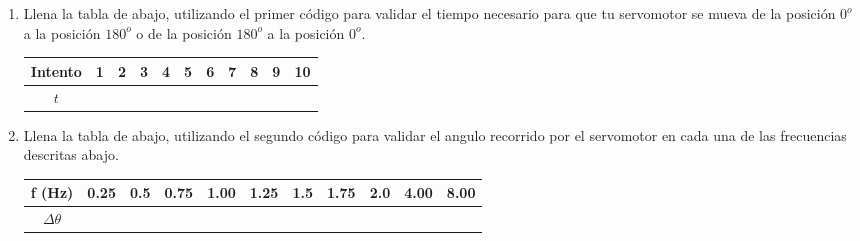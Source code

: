	\begin{enumerate}
		\item Llena la tabla de abajo, utilizando el primer código para validar el tiempo necesario para que tu servomotor se mueva de la posición $0^o$ a la posición $180^o$ o de la posición $180^o$ a la posición $0^o$.

		\begin{center}
			\begin{tabular}{|c|c|c|c|c|c|c|c|c|c|c|}
				 \hline
				 Intento & 1 & 2 & 3 & 4 & 5 & 6 & 7 & 8 & 9 & 10 \\
				 \hline
				 $t$ &\hspace{0.6cm} &\hspace{0.6cm} &\hspace{0.6cm} &\hspace{0.6cm} &\hspace{0.6cm} &\hspace{0.6cm} &\hspace{0.6cm} &\hspace{0.6cm} &\hspace{0.6cm} &\hspace{0.6cm} \\
				 \hline
			\end{tabular}
		\end{center}

		\item Llena la tabla de abajo, utilizando el segundo código para validar el angulo recorrido por el servomotor en cada una de las frecuencias descritas abajo.

		\begin{center}
			\begin{tabular}{|c|c|c|c|c|c|c|c|c|c|c|}
				 \hline
				 f (Hz) & 0.25 & 0.5 & 0.75 & 1.00 & 1.25 & 1.5 & 1.75 & 2.0 & 4.00 & 8.00 \\
				 \hline
				 $\Delta\theta$ &\hspace{0.6cm} &\hspace{0.6cm} &\hspace{0.6cm} &\hspace{0.6cm} &\hspace{0.6cm} &\hspace{0.6cm} &\hspace{0.6cm} &\hspace{0.6cm} &\hspace{0.6cm} &\hspace{0.6cm} \\
				 \hline
			\end{tabular}
		\end{center}


\end{enumerate}
